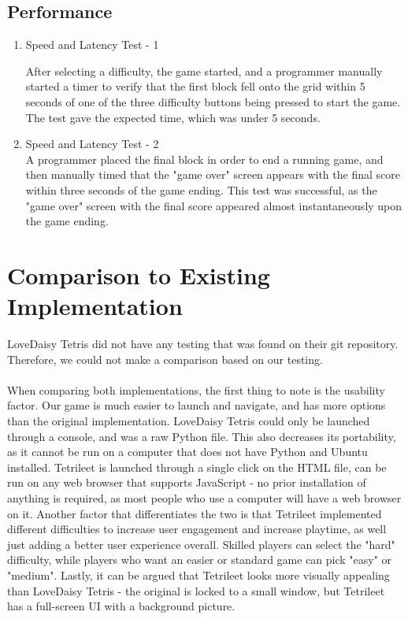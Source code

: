 \documentclass[12pt, titlepage]{article}
\begin{document}
\subsection{Performance}

\begin{enumerate}

\item{Speed and Latency Test - 1\\}

After selecting a difficulty, the game started, and a programmer manually started a timer to verify that the first block fell onto the grid within 5 seconds of one of the three difficulty buttons being pressed to start the game. The test gave the expected time, which was under 5 seconds.

\item{Speed and Latency Test - 2\\}
A programmer placed the final block in order to end a running game, and then manually timed that the "game over" screen appears with the final score within three seconds of the game ending. This test was successful, as the "game over" screen with the final score appeared almost instantaneously upon the game ending.

\end{enumerate}
\section{Comparison to Existing Implementation}	
LoveDaisy Tetris did not have any testing that was found on their git repository. Therefore, we could not make a comparison based on our testing.
\\\\
When comparing both implementations, the first thing to note is the usability factor. Our game is much easier to launch and navigate, and has more options than the original implementation. LoveDaisy Tetris could only be launched through a console, and was a raw Python file. This also decreases its portability, as it cannot be run on a computer that does not have Python and Ubuntu installed. Tetrileet is launched through a single click on the HTML file, can be run on any web browser that supports JavaScript - no prior installation of anything is required, as most people who use a computer will have a web browser on it. Another factor that differentiates the two is that Tetrileet implemented different difficulties to increase user engagement and increase playtime, as well just adding a better user experience overall. Skilled players can select the "hard" difficulty, while players who want an easier or standard game can pick "easy" or "medium". Lastly, it can be argued that Tetrileet looks more visually appealing than LoveDaisy Tetris - the original is locked to a small window, but Tetrileet has a full-screen UI with a background picture.
\end{document}
